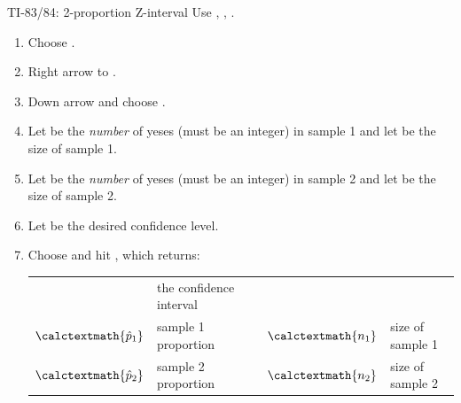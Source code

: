 \newpage
\begin{onebox}{ TI-83/84: 2-proportion Z-interval}
Use , , .
\begin{enumerate}
\setlength{\itemsep}{0mm}
\item Choose .
\item Right arrow to .
\item Down arrow and choose .
\item Let  be the \emph{number} of yeses (must be an integer) in sample 1 and let  be the size of sample 1.
\item Let  be the \emph{number} of yeses (must be an integer) in sample 2 and let  be the size of sample 2.
\item Let  be the desired confidence level.
\item Choose  and hit , which returns: \\[1mm]
\begin{tabular}{ll l ll}
\calctext{(\underline{\ \ },\underline{\ \ })} & the confidence interval \\
$\calctextmath{\hat{p}_1}$ & sample 1 proportion &\quad&
	$\calctextmath{n_1}$ & size of sample 1 \\
$\calctextmath{\hat{p}_2}$ & sample 2 proportion &&
	$\calctextmath{n_2}$ &  size of sample 2
\end{tabular}
\end{enumerate}
\end{onebox}
%
